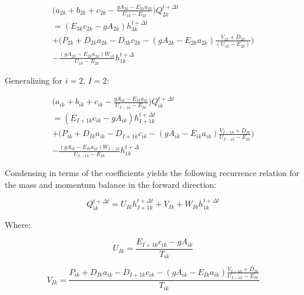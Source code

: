 \documentclass[11pt]{article}
\begin{document}
\begin{equation}
  \begin{split}
    \biggl( a_{2k} + b_{2k} + c_{2k} - \frac{g A_{2k} - E_{2k} a_{2k}}{U_{1k} - E_{2k}} \biggr)  Q_{2k}^{t + \Delta t} \\ =  ( E_{3k} c_{2k} - g A_{2k}) h_{3k}^{t + \Delta t}   
   \\ + \biggl( P_{2k} + D_{2k} a_{2k}   - D_{3k} c_{2k} - (g A_{2k} - E_{2k} a_{2k}) \frac{ V_{1k} + D_{2k} }{( U_{1k} - E_{2k} )} \biggr) \\ - \frac{(g A_{2k} - E_{2k} a_{2k}) W_{1k} }{U_{1k} - E_{2k}} h_{1k}^{t + \Delta} 
  \end{split}
\end{equation}

Generalizing for $i = 2$, $I = 2$:

\begin{equation}
  \begin{split}
    \biggl( a_{ik} + b_{ik} + c_{ik} - \frac{g A_{ik} - E_{Ik} a_{ik}}{U_{I - 1k} - E_{Ik}} \biggr)  Q_{ik}^{t + \Delta t} \\ =  ( E_{I + 1k} c_{ik} - g A_{ik}) h_{I + 1k}^{t + \Delta t}   
   \\ + \biggl( P_{ik} + D_{Ik} a_{ik}   - D_{I+1k} c_{ik} - (g A_{ik} - E_{ik} a_{ik}) \frac{ V_{I-1k} + D_{Ik} }{ U_{I-1k} - E_{Ik} } \biggr) \\ - \frac{(g A_{ik} - E_{Ik} a_{ik}) W_{I - 1k} }{U_{I - 1k} - E_{Ik}} h_{1k}^{t + \Delta} 
  \end{split}
\end{equation}

Condensing in terms of the coefficients yields the following recurrence relation for the mass
and momentum balance in the forward direction: 

\begin{equation}
  \boxed{
 Q_{ik}^{t + \Delta t} = U_{Ik} h_{I + 1k}^{t + \Delta t} + V_{Ik} + W_{Ik} h_{1k}^{t + \Delta t} 
 }
\end{equation}

Where:

\begin{equation}
  \boxed{
    U_{Ik} = \frac{E_{I + 1k} c_{ik} - g A_{ik}}{T_{ik}}
 }
\end{equation}

\begin{equation}
  \boxed{
    V_{Ik} = \frac{ P_{ik} + D_{Ik} a_{ik} - D_{I + 1k} c_{ik} - (g A_{ik} - E_{Ik} a_{ik}) \frac{ V_{I-1k} + D_{Ik} }{ U_{I-1k} - E_{Ik} }}{T_{ik}}
 }
\end{equation}
\end{document}

